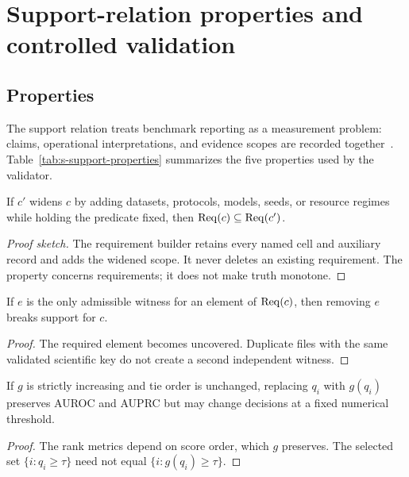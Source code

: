 \section{Support-relation properties and controlled validation}
\label{sec:s-support}

\subsection{Properties}

The support relation treats benchmark reporting as a measurement problem: claims, operational interpretations, and evidence scopes are recorded together~\cite{jacobs2021measurement,reuel2024betterbench,bordes2025evalfacts}. Table~\ref{tab:s-support-properties} summarizes the five properties used by the validator.



\begin{proposition}
If \(c'\) widens \(c\) by adding datasets, protocols, models, seeds, or resource regimes while holding the predicate fixed, then \(\operatorname{Req}(c)\subseteq\operatorname{Req}(c')\).
\end{proposition}
\begin{proof}[Proof sketch]
The requirement builder retains every named cell and auxiliary record and adds the widened scope. It never deletes an existing requirement. The property concerns requirements; it does not make truth monotone.
\end{proof}

\begin{proposition}
If \(e\) is the only admissible witness for an element of \(\operatorname{Req}(c)\), then removing \(e\) breaks support for \(c\).
\end{proposition}
\begin{proof}
The required element becomes uncovered. Duplicate files with the same validated scientific key do not create a second independent witness.
\end{proof}

\begin{proposition}
If \(g\) is strictly increasing and tie order is unchanged, replacing \(q_i\) with \(g(q_i)\) preserves AUROC and AUPRC but may change decisions at a fixed numerical threshold.
\end{proposition}
\begin{proof}
The rank metrics depend on score order, which \(g\) preserves. The selected set \(\{i:q_i\geq\tau\}\) need not equal \(\{i:g(q_i)\geq\tau\}\).
\end{proof}

